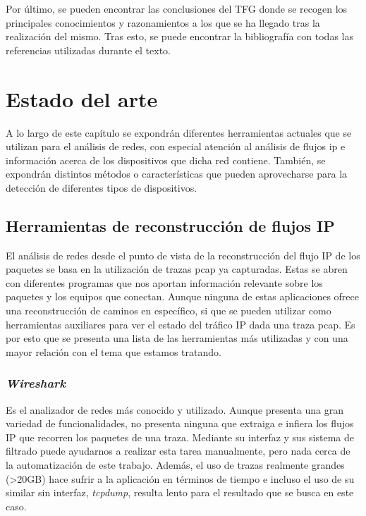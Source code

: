 \documentclass[tfg,epsbased,lof,lot,loa,covers,final,copyright,overleaf]{tfgtfmthesisuam}
\begin{document}
Por último, se pueden encontrar las conclusiones del TFG donde se recogen los principales conocimientos y razonamientos a los que se ha llegado tras la realización del mismo. Tras esto, se puede encontrar la bibliografía con todas las referencias utilizadas durante el texto.

\chapter{Estado del arte}
A lo largo de este capítulo se expondrán diferentes herramientas actuales que se utilizan para el análisis de redes, con especial atención al análisis de flujos \gls{ip} e información acerca de los dispositivos que dicha red contiene. También, se expondrán distintos métodos o características que pueden aprovecharse para la detección de diferentes tipos de dispositivos.

\section{Herramientas de reconstrucción de flujos IP}
El análisis de redes desde el punto de vista de la reconstrucción del flujo IP de los paquetes se basa en la utilización de trazas pcap ya capturadas. Estas se abren con diferentes programas que nos aportan información relevante sobre los paquetes y los equipos que conectan. Aunque ninguna de estas aplicaciones ofrece una reconstrucción de caminos en específico, si que se pueden utilizar como herramientas auxiliares para ver el estado del tráfico IP dada una traza pcap. Es por esto que se presenta una lista de las herramientas más utilizadas \cite{Gandhi2014} y con una mayor relación con el tema que estamos tratando.

\subsection{\textit{Wireshark}}
Es el analizador de redes más conocido y utilizado. Aunque presenta una gran variedad de funcionalidades, no presenta ninguna que extraiga e infiera los flujos IP que recorren los paquetes de una traza. Mediante su interfaz y sus sistema de filtrado puede ayudarnos a realizar esta tarea manualmente, pero nada cerca de la automatización de este trabajo. Además, el uso de trazas realmente grandes (>20GB) hace sufrir a la aplicación en términos de tiempo e incluso el uso de su similar sin interfaz, \textit{tcpdump}, resulta lento para el resultado que se busca en este caso.
\end{document}
